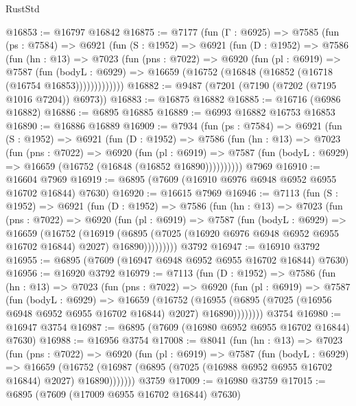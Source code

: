 \begin{lexlean}{RustStd}
\begin{coremodule}
@16853 := @16797 @16842
@16875 := @7177
    (fun (Γ : @6925) =>
    @7585
      (fun (ps : @7584) =>
      @6921
        (fun (S : @1952) =>
        @6921
          (fun (D : @1952) =>
          @7586
            (fun (hn : @13) =>
            @7023
              (fun (pns : @7022) =>
              @6920
                (fun (pl : @6919) =>
                @7587
                  (fun (bodyL : @6929) =>
                  @16659 (@16752 (@16848 (@16852 (@16718 (@16754 @16853)))))))))))))
@16882 := @9487 (@7201 (@7190 (@7202 (@7195 @1016 @7204)) @6973))
@16883 := @16875 @16882
@16885 := @16716 (@6986 @16882)
@16886 := @6895 @16885
@16889 := @6993 @16882 @16753 @16853
@16890 := @16886 @16889
@16909 := @7934
    (fun (ps : @7584) =>
    @6921
      (fun (S : @1952) =>
      @6921
        (fun (D : @1952) =>
        @7586
          (fun (hn : @13) =>
          @7023
            (fun (pns : @7022) =>
            @6920
              (fun (pl : @6919) =>
              @7587 (fun (bodyL : @6929) => @16659 (@16752 (@16848 (@16852 @16890))))))))))
    @7969
@16910 := @16604 @7969
@16919 := @6895 (@7609 (@16910 @6976 @6948 @6952 @6955 @16702 @16844) @7630)
@16920 := @16615 @7969
@16946 := @7113
    (fun (S : @1952) =>
    @6921
      (fun (D : @1952) =>
      @7586
        (fun (hn : @13) =>
        @7023
          (fun (pns : @7022) =>
          @6920
            (fun (pl : @6919) =>
            @7587
              (fun (bodyL : @6929) =>
              @16659
                (@16752
                  (@16919
                    (@6895
                      (@7025 (@16920 @6976 @6948 @6952 @6955 @16702 @16844) @2027)
                      @16890)))))))))
    @3792
@16947 := @16910 @3792
@16955 := @6895 (@7609 (@16947 @6948 @6952 @6955 @16702 @16844) @7630)
@16956 := @16920 @3792
@16979 := @7113
    (fun (D : @1952) =>
    @7586
      (fun (hn : @13) =>
      @7023
        (fun (pns : @7022) =>
        @6920
          (fun (pl : @6919) =>
          @7587
            (fun (bodyL : @6929) =>
            @16659
              (@16752
                (@16955 (@6895 (@7025 (@16956 @6948 @6952 @6955 @16702 @16844) @2027) @16890))))))))
    @3754
@16980 := @16947 @3754
@16987 := @6895 (@7609 (@16980 @6952 @6955 @16702 @16844) @7630)
@16988 := @16956 @3754
@17008 := @8041
    (fun (hn : @13) =>
    @7023
      (fun (pns : @7022) =>
      @6920
        (fun (pl : @6919) =>
        @7587
          (fun (bodyL : @6929) =>
          @16659
            (@16752 (@16987 (@6895 (@7025 (@16988 @6952 @6955 @16702 @16844) @2027) @16890)))))))
    @3759
@17009 := @16980 @3759
@17015 := @6895 (@7609 (@17009 @6955 @16702 @16844) @7630)

\end{coremodule}
\end{lexlean}
